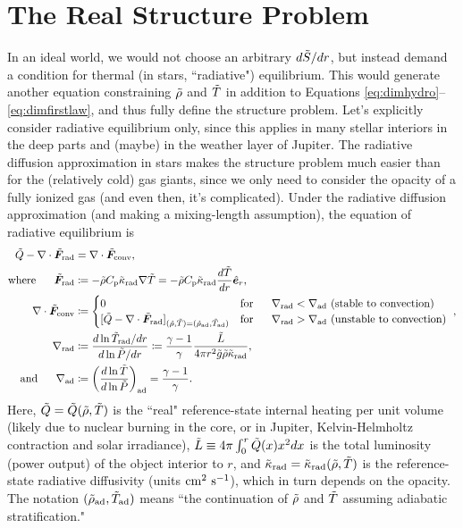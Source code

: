 \documentclass[12pt]{article}
\numberwithin{equation}{section}
\begin{document}
\section{The Real Structure Problem}\label{sec:refreal}
In an ideal world, we would not choose an arbitrary $d\tilde{S}/dr$, but instead demand a condition for thermal (in stars, ``radiative") equilibrium. This would generate another equation constraining $\tilde{\rho}$ and $\tilde{T}$ in addition to Equations \eqref{eq:dimhydro}--\eqref{eq:dimfirstlaw}, and thus fully define the structure problem. Let's explicitly consider radiative equilibrium only, since this applies in many stellar interiors in the deep parts and (maybe) in the weather layer of Jupiter. The radiative diffusion approximation in stars makes the structure problem much easier than for the (relatively cold) gas giants, since we only need to consider the opacity of a fully ionized gas (and even then, it's complicated). Under the radiative diffusion approximation (and making a mixing-length assumption), the equation of radiative equilibrium is
\begin{subequations}\label{eq:dimradequil}
\begin{align}
	\heattilde - \Div\fradtilde &= \Div\fconvtilde\label{eq:dimradequil1},\\
	\where \fradtilde &\define  -\rhotilde \cpcap\kradtilde \nabla\tmptilde=-\rhotilde \cpcap\kradtilde \frac{d\tmptilde}{dr}\er,\label{eq:dimradequil2}\\
	 \Div\fconvtilde &\define \begin{cases} 0 \five &\text{for}\five \nabla_{\rm rad} <\nabla_{\rm ad}\ \text{(stable to convection)}\\
	[\heattilde - \Div\fradtilde]_{(\rhotilde,\tmptilde)=(\rhotilde_{\rm ad}, \tmptilde_{\rm ad})}&\text{for}\five \nabla_{\rm rad} >\nabla_{\rm ad}\ \text{(unstable to convection)}\
		\end{cases},\label{eq:dimradequil3}\\
		\nabla_{\rm rad}&\define \frac{d\ln\tmptilde_{\rm rad}/dr}{d\ln\prstilde/dr} \define \frac{\gamma-1}{\gamma}\frac{\lumtilde}{4\pi r^2 \gtilde \rhotilde \kradtilde},\label{eq:dimradequil4}\\
		\andd \nabla_{\rm ad}&\define  \left(\frac{d\ln\tmptilde}{d\ln\prstilde}\right)_{\rm ad} = \frac{\gamma-1}{\gamma}.
\end{align}
\end{subequations}
Here, $\tilde{Q}=\tilde{Q}(\tilde{\rho},\tilde{T})$ is the ``real" reference-state internal heating per unit volume (likely due to nuclear burning in the core, or in Jupiter, Kelvin-Helmholtz contraction and solar irradiance), $\tilde{L}\equiv 4\pi\int_0^r \tilde{Q}(x) x^2dx$ is the total luminosity (power output) of the object interior to $r$, and $\tilde{\kappa}_{\rm rad}=\tilde{\kappa}_{\rm rad}(\tilde{\rho},\tilde{T})$ is the reference-state radiative diffusivity (units $\rm{cm^2\ s^{-1}}$), which in turn depends on the opacity. The notation $(\tilde{\rho}_{\rm ad}, \tilde{T}_{\rm ad})$ means ``the continuation of $\tilde{\rho}$ and $\tilde{T}$ assuming adiabatic stratification."
\end{document}

